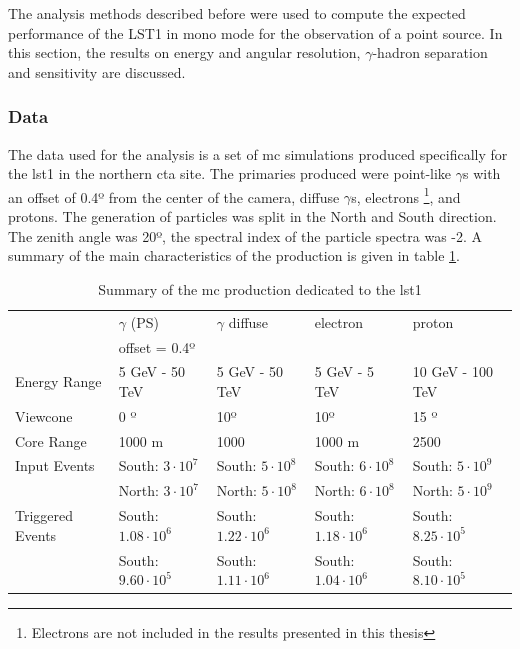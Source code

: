 \documentclass[main.tex]{subfiles}
\begin{document}
The analysis methods described before were used to compute the expected performance of the LST1 in mono mode for the observation of a point source. In this section, the results on energy and angular resolution, $\gamma$-hadron separation and sensitivity are discussed.

\subsubsection{Data} \label{sec:mcdata}

The data used for the analysis is a set of \gls{mc} simulations produced specifically for the \gls{lst}1 in the northern \gls{cta} site. The primaries produced were point-like $\gamma$s with an offset of 0.4º from the center of the camera, diffuse $\gamma$s, electrons \footnote{Electrons are not included in the results presented in this thesis}, and protons. The generation of particles was split in the North and South direction. The zenith angle was 20º, the spectral index of the particle spectra was -2. A summary of the main characteristics of the production is given in table \ref{tab:mcprod}.

\begin{table}
  \centering
  \begin{tabular}{|l|l|l|l|l|}
    \hline
    & $\gamma$ (PS) & $\gamma$ diffuse & electron & proton\\
    & offset = 0.4º & & & \\
    \hline
    Energy Range & 5 GeV - 50 TeV & 5 GeV - 50 TeV & 5 GeV - 5 TeV & 10 GeV - 100 TeV\\
    Viewcone     & 0 º  & 10º & 10º & 15 º \\
    Core Range  & 1000 m & 1000 & 1000 m & 2500 \\
    Input Events & South: $3\cdot 10^7$ & South: $5\cdot 10^8$ & South: $6\cdot 10^8$ & South: $5\cdot 10^9$ \\
    & North: $3\cdot 10^7$ & North: $5\cdot 10^8$ & North: $6\cdot 10^8$ & North: $5\cdot 10^9$ \\
    Triggered Events & South: $1.08\cdot 10^6 $ & South: $1.22\cdot 10^6 $ & South: $1.18\cdot 10^6 $ & South: $8.25\cdot 10^5 $ \\
    & South: $9.60\cdot 10^5 $ & South: $1.11\cdot 10^6 $ & South: $1.04\cdot 10^6 $ & South: $8.10\cdot 10^5 $ \\
    \hline
  \end{tabular}
  \caption{Summary of the \gls{mc} production dedicated to the \gls{lst}1}\label{tab:mcprod}
\end{table}
\end{document}

